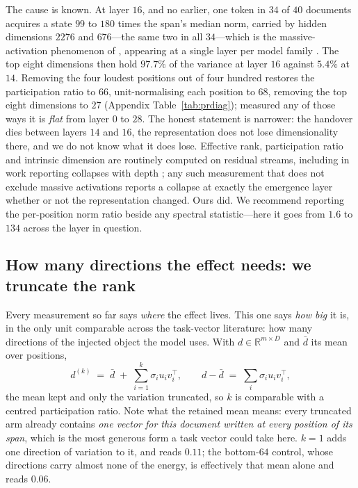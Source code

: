 \documentclass{article}
\newcommand{\dvec}{\ensuremath{d}}
\begin{document}
The cause is known. At layer $16$, and no earlier, one token in $34$ of $40$
documents acquires a state $99$ to $180$ times the span's median norm, carried by hidden
dimensions $2276$ and $676$---the same two in all $34$---which is the
massive-activation phenomenon of \citet{sun2024massive}, appearing at a single
layer per model family \citep{shi2026melayer}. The top eight dimensions then
hold $97.7\%$ of the variance at layer $16$ against $5.4\%$ at $14$. Removing
the four loudest positions out of four hundred restores the participation ratio
to $66$, unit-normalising each position to $68$, removing the top eight
dimensions to $27$ (Appendix Table~\ref{tab:prdiag}); measured any of those ways
it is \emph{flat} from layer $0$ to $28$. The honest statement is
narrower: the handover dies between layers $14$ and $16$, the representation
does not lose dimensionality there, and we do not know what it does lose.
Effective rank, participation ratio and intrinsic dimension are routinely
computed on residual streams, including in work reporting collapses with depth
\citep{fernando2026residualspectral, sarkar2026causaldim}; any such measurement
that does not exclude massive activations reports a collapse at exactly the
emergence layer whether or not the representation changed. Ours did. We
recommend reporting the per-position norm ratio beside any spectral
statistic---here it goes from $1.6$ to $134$ across the layer in question.

\subsection{How many directions the effect needs: we truncate the rank}
\label{sec:rank}

Every measurement so far says \emph{where} the effect lives. This one says
\emph{how big} it is, in the only unit comparable across the task-vector
literature: how many directions of the injected object the model uses. With
$\dvec \in \mathbb{R}^{m \times D}$ and $\bar{\dvec}$ its mean over positions,
\begin{equation}
\dvec^{(k)} \;=\; \bar{\dvec} \;+\; \sum_{i=1}^{k} \sigma_i u_i v_i^{\top},
\qquad
\dvec - \bar{\dvec} \;=\; \textstyle\sum_i \sigma_i u_i v_i^{\top},
\label{eq:rank}
\end{equation}
the mean kept and only the variation truncated, so $k$ is comparable with a
centred participation ratio. Note what the retained mean means: every truncated
arm already contains \emph{one vector for this document written at every
position of its span}, which is the most generous form a task vector could take
here. $k=1$ adds one direction of variation to it, and reads $0.11$; the
bottom-$64$ control, whose directions carry almost none of the energy, is
effectively that mean alone and reads $0.06$.
\end{document}
